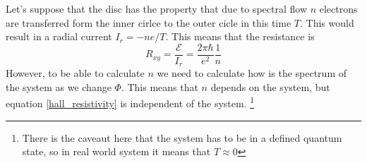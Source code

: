     
        Let's suppose that the disc has the property that due to spectral flow $n$ electrons are transferred form the inner cirlce to the outer cicle in this time $T$. This would result in a radial current $I_r=-ne/T$. This means that the resistance is 
        \begin{equation} 
            \label{hall_resistivity}
                R_{xy}=\frac{\mathcal {E}}{I_r}=\frac{2\pi\hbar}{e^2}\frac 1n
        \end{equation}
        However, to be able to calculate $n$ we need to calculate how is the spectrum of the system as we change $\Phi$. This means that $n$ depends on the system, but equation \ref{hall_resistivity} is independent of the system. \footnote{There is the caveaut here that the system has to be in a defined quantum state, so in real world system it means that $T\approx0$}